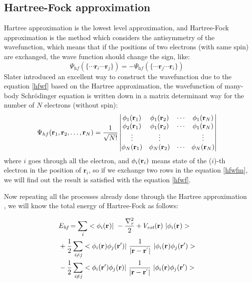 \documentclass[a4paper]{report}
\begin{document}
\subsection{Hartree-Fock approximation}
\noindent Hartree approximation is the lowest level approximation, and Hartree-Fock approximation is the method which considers the 
antisymmetry of the wavefunction, which means that if the positions of two electrons (with same spin) are exchanged, the wave 
function should change the sign, like:
\begin{equation}\label{hfwf}
\Psi_\textit{hf} (\{ \cdots \textbf{r}_\textit{i} \cdots  \textbf{r}_\textit{j} \}) = - \Psi_\textit{hf} (\{ \cdots \textbf{r}_\textit{j} \cdots  \textbf{r}_\textit{i} \})
\end{equation}
\noindent Slater introduced  an excellent way to construct the wavefunction due to the equation \ref{hfwf} based on the Hartree approximation, 
the wavefunction of many- body Schrödinger equation is written down  in a matrix determinant way for the number of $N$ electrons 
(without spin):
\begin{equation}\label{hfwfm}
\Psi_{hf}(\mathbf{r}_1, \mathbf{r}_2, \ldots, \mathbf{r}_N) =
\frac{1}{\sqrt{N!}} \left|
\begin{matrix}
    \bwf<1><1> & \bwf<1><2> & \cdots & \bwf<1><N> \\
    \bwf<2><1> & \bwf<1><2> & \cdots & \bwf<1><N> \\
    \vdots               & \vdots               &        & \vdots               \\
    \bwf<N><1> & \bwf<N><2> & \cdots & \bwf<N><N>
\end{matrix} \right|
\end{equation}
\noindent where $i$ goes through all the electron, and $\bwf<i><i>$ means state of the ($i$)-th electron in the position of $\textbf{r}_\textit{i}$, so if we exchange two rows
 in the equation \ref{hfwfm}, we will find out the result is satisfied with the equation \ref{hfwf}.

\noindent Now repeating all the processes already done through the Hartree approximation , we will know the total energy of Hartree-Fock as follows:

\begin{equation}\begin{split}
&E_\textit{hf} = \sumi<i> <\bwf<i><> |\ -\frac{\nabla^{2}_{\textit r}}{2} + V_\textit{ext}(\textbf{r})  \ | \bwf<i><> > \\
& + \frac{1}{2} \suminj<i><j> <\bwf<i><> \bwfn<j><'>|\ \frac{1}{|\textbf{r} - \textbf{r}^{'} |} \ | \bwf<i><> \bwfn<j><'>> \\
& - \frac{1}{2} \suminj<i><j> <\bwfn<i><'> \bwfn<j><>|\ \frac{1}{|\textbf{r} - \textbf{r}^{'} |} \ | \bwfn<i><> \bwfn<j><'>>
\end{split}\end{equation}
\end{document}
